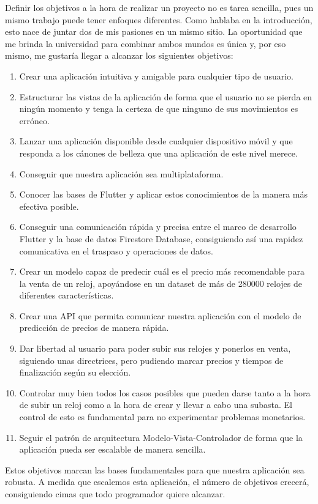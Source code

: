 
	Definir los objetivos a la hora de realizar un proyecto no es tarea sencilla, pues un mismo trabajo puede tener enfoques diferentes. Como hablaba en la introducción, esto nace de juntar dos de mis pasiones en un mismo sitio. La oportunidad que me brinda la universidad para combinar ambos mundos es única y, por eso mismo, me gustaría llegar a alcanzar los siguientes objetivos:

\begin{enumerate}
	\item Crear una aplicación intuitiva y amigable para cualquier tipo de usuario.
	\item Estructurar las vistas de la aplicación de forma que el usuario no se pierda en ningún momento y tenga la certeza de que ninguno de sus movimientos es erróneo.
	\item Lanzar una aplicación disponible desde cualquier dispositivo móvil y que responda a los cánones de belleza que una aplicación de este nivel merece.
	\item Conseguir que nuestra aplicación sea multiplataforma.
	\item Conocer las bases de Flutter y aplicar estos conocimientos de la manera más efectiva posible.
	\item Conseguir una comunicación rápida y precisa entre el marco de desarrollo Flutter y la base de datos Firestore Database, consiguiendo así una rapidez comunicativa en el traspaso y operaciones de datos.
	\item Crear un modelo capaz de predecir cuál es el precio más recomendable para la venta de un reloj, apoyándose en un dataset de más de 280000 relojes de diferentes características.
	\item Crear una API que permita comunicar nuestra aplicación con el modelo de predicción de precios de manera rápida.
	\item Dar libertad al usuario para poder subir sus relojes y ponerlos en venta, siguiendo unas directrices, pero pudiendo marcar precios y tiempos de finalización según su elección.
	\item Controlar muy bien todos los casos posibles que pueden darse tanto a la hora de subir un reloj como a la hora de crear y llevar a cabo una subasta. El control de esto es fundamental para no experimentar problemas monetarios.
	\item Seguir el patrón de arquitectura Modelo-Vista-Controlador de forma que la aplicación pueda ser escalable de manera sencilla.
\end{enumerate}

	Estos objetivos marcan las bases fundamentales para que nuestra aplicación sea robusta. A medida que escalemos esta aplicación, el número de objetivos crecerá, consiguiendo cimas que todo programador quiere alcanzar.